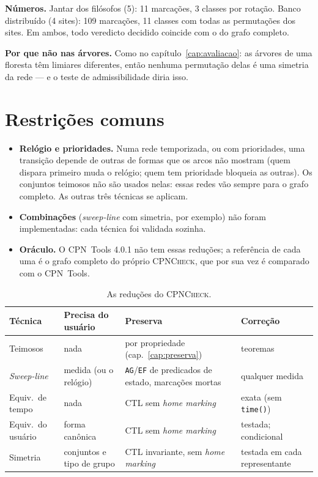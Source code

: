 \documentclass[11pt,a4paper]{report}
\newcommand{\cpn}{\textsc{CPNCheck}}
\newcommand{\cpntools}{CPN~Tools}
\newcommand{\code}[1]{\texttt{\small #1}}
\theoremstyle{definition}
\begin{document}
\textbf{Números.} Jantar dos filósofos (5): 11 marcações, 3 classes por
rotação. Banco distribuído (4 sites): 109 marcações, 11 classes com todas as
permutações dos sites. Em ambos, todo veredicto decidido coincide com o do
grafo completo.

\textbf{Por que não nas árvores.} Como no capítulo~\ref{cap:avaliacao}: as
árvores de uma floresta têm limiares diferentes, então nenhuma permutação delas
é uma simetria da rede --- e o teste de admissibilidade diria isso.

\section{Restrições comuns}

\begin{itemize}[leftmargin=1.4em]
  \item \textbf{Relógio e prioridades.} Numa rede temporizada, ou com
        prioridades, uma transição depende de outras de formas que os arcos
        não mostram (quem dispara primeiro muda o relógio; quem tem prioridade
        bloqueia as outras). Os conjuntos teimosos não são usados nelas: essas
        redes vão sempre para o grafo completo. As outras três técnicas se
        aplicam.
  \item \textbf{Combinações} (\emph{sweep-line} com simetria, por exemplo) não
        foram implementadas: cada técnica foi validada sozinha.
  \item \textbf{Oráculo.} O \cpntools{} 4.0.1 não tem essas reduções; a
        referência de cada uma é o grafo completo do próprio \cpn{}, que por
        sua vez é comparado com o \cpntools{}.
\end{itemize}

\begin{table}[ht]
\centering\small
\begin{tabular}{>{\raggedright\arraybackslash}p{2.4cm}>{\raggedright\arraybackslash}p{3.2cm}>{\raggedright\arraybackslash}p{4.0cm}>{\raggedright\arraybackslash}p{3.4cm}}
\toprule
Técnica & Precisa do usuário & Preserva & Correção \\
\midrule
Teimosos & nada & por propriedade (cap.~\ref{cap:preserva}) & teoremas \\
\emph{Sweep-line} & medida (ou o relógio) & \code{AG}/\code{EF} de predicados de estado, marcações mortas & qualquer medida \\
Equiv.\ de tempo & nada & CTL sem \emph{home marking} & exata (sem \code{time()}) \\
Equiv.\ do usuário & forma canônica & CTL sem \emph{home marking} & testada; condicional \\
Simetria & conjuntos e tipo de grupo & CTL invariante, sem \emph{home marking} & testada em cada representante \\
\bottomrule
\end{tabular}
\caption{As reduções do \cpn{}.}
\end{table}
\end{document}
